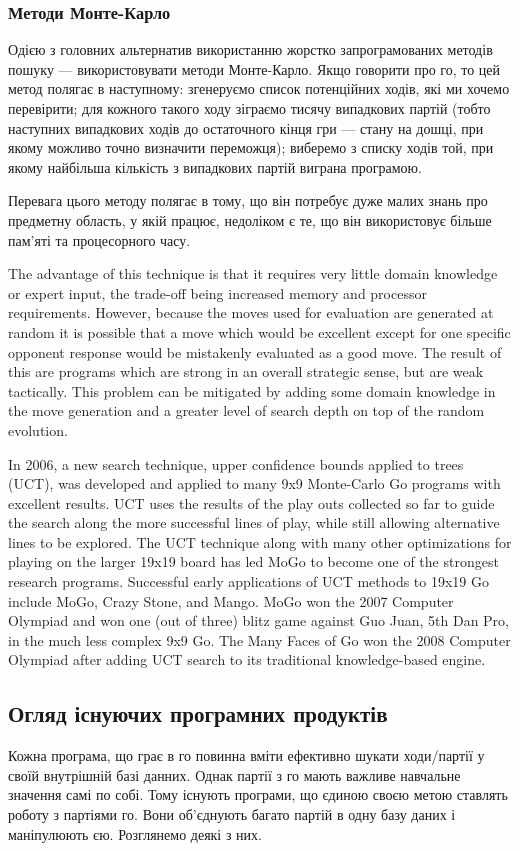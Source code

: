 \subsubsection{Методи Монте-Карло}
Одією з головних альтернатив використанню жорстко запрограмованих методів пошуку --- використовувати методи Монте-Карло. Якщо говорити про го, то цей метод полягає в наступному:  згенеруємо список потенційних ходів, які ми хочемо перевірити; для кожного такого ходу зіграємо тисячу випадкових партій (тобто наступних випадкових ходів до остаточного кінця гри --- стану на дошці, при якому можливо точно визначити переможця); виберемо з списку ходів той, при якому найбільша кількість з випадкових партій виграна програмою.

Перевага цього методу полягає в тому, що він потребує дуже малих знань про предметну область, у якій працює, недоліком є те, що він використовує більше пам'яті та процесорного часу.

The advantage of this technique is that it requires very little domain knowledge or expert input, the trade-off being increased memory and processor requirements. However, because the moves used for evaluation are generated at random it is possible that a move which would be excellent except for one specific opponent response would be mistakenly evaluated as a good move. The result of this are programs which are strong in an overall strategic sense, but are weak tactically. This problem can be mitigated by adding some domain knowledge in the move generation and a greater level of search depth on top of the random evolution.

In 2006, a new search technique, upper confidence bounds applied to trees (UCT), was developed and applied to many 9x9 Monte-Carlo Go programs with excellent results. UCT uses the results of the play outs collected so far to guide the search along the more successful lines of play, while still allowing alternative lines to be explored. The UCT technique along with many other optimizations for playing on the larger 19x19 board has led MoGo to become one of the strongest research programs. Successful early applications of UCT methods to 19x19 Go include MoGo, Crazy Stone, and Mango. MoGo won the 2007 Computer Olympiad and won one (out of three) blitz game against Guo Juan, 5th Dan Pro, in the much less complex 9x9 Go. The Many Faces of Go won the 2008 Computer Olympiad after adding UCT search to its traditional knowledge-based engine.
\subsection{Огляд існуючих програмних продуктів}
Кожна програма, що грає в го повинна вміти ефективно шукати ходи/партії у своїй внутрішній базі данних. Однак партії з го мають важливе навчальне значення самі по собі. Тому існують програми, що єдиною своєю метою ставлять роботу з партіями го. Вони об'єднують багато партій в одну базу даних і маніпулюють єю. Розглянемо деякі з них.
